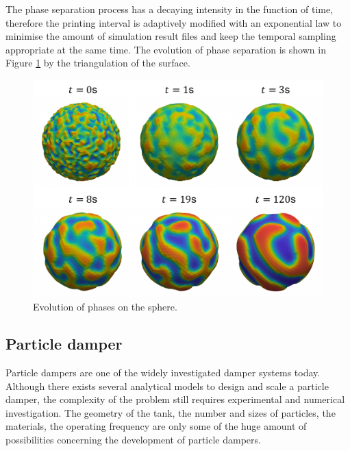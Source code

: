 \documentclass[a4paper,12pt,openany]{book}
\theoremstyle{break}
\begin{document}
The phase separation process has a decaying intensity in the function of time, therefore the printing interval is adaptively modified with an exponential law to minimise the amount of simulation result files and keep the temporal sampling appropriate at the same time. The evolution of phase separation is shown in Figure \ref{fig:cahnhilliard_result} by the triangulation of the surface.
\begin{figure}[h!]
  \includegraphics[scale=0.6]{cahnhilliard_result.pdf}
  \centering
  \caption{Evolution of phases on the sphere.}
  \label{fig:cahnhilliard_result}
\end{figure}\vspace*{3pt}


\subsection{Particle damper}
Particle dampers are one of the widely investigated damper systems today. Although there exists several analytical models to design and scale a particle damper, the complexity of the problem still requires experimental and numerical investigation. The geometry of the tank, the number and sizes of particles, the materials, the operating frequency are only some of the huge amount of possibilities concerning the development of particle dampers.
\end{document}
